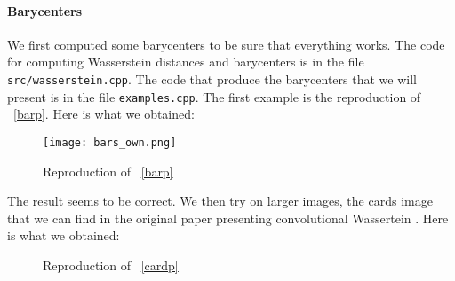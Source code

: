 \paragraph{Barycenters}
We first computed some barycenters to be sure that everything works. The code for computing Wasserstein distances and barycenters is in the file \verb|src/wasserstein.cpp|. The code that produce the barycenters that we will present is in the file \verb|examples.cpp|. The first example is the reproduction of \figurename~\ref{barp}. Here is what we obtained:

\begin{figure}[h]
	\centering
	\texttt{[image: bars\_own.png]}
	\caption{Reproduction of \figurename~\ref{barp}}
\end{figure}

The result seems to be correct. We then try on larger images, the cards image that we can find in the original paper presenting convolutional Wassertein \cite{Goe++}. Here is what we obtained:

\begin{figure}[h]
	\centering
	\caption{Reproduction of \figurename~\ref{cardp}}
\end{figure}